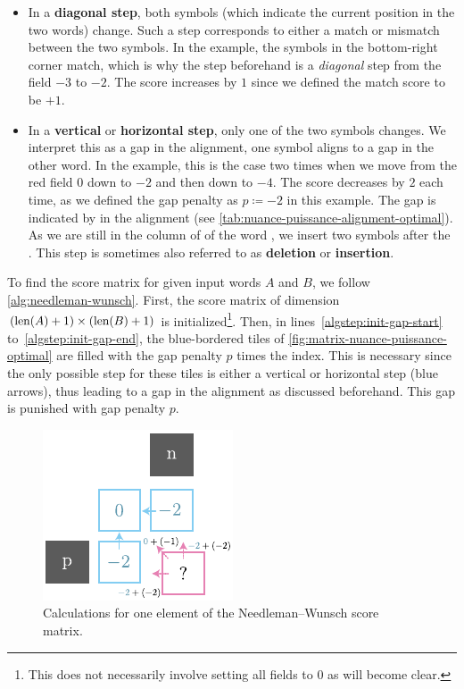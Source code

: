 \begin{itemize}

    \item In a \textbf{diagonal step}, both symbols (which indicate the current position in the two words) change. Such a step corresponds to either a match or mismatch between the two symbols. In the example, the  symbols in the bottom-right corner match, which is why the step beforehand is a \textit{diagonal} step from the field $-3$ to $-2$. The score increases by $1$ since we defined the match score to be $+1$.

    \item In a \textbf{vertical} or \textbf{horizontal step}, only one of the two symbols changes. We interpret this as a gap in the alignment, \ie one symbol aligns to a gap in the other word. In the example, this is the case two times when we move from the red field $0$ down to $-2$ and then down to $-4$. The score decreases by $2$ each time, as we defined the gap penalty as $p \coloneqq -2$ in this example. The gap is indicated by \q{--} in the alignment (see \autoref{tab:nuance-puissance-alignment-optimal}). As we are still in the column of \textipa{/\textturnh/} of the word , we insert two \q{--} symbols after the \textipa{/\textturnh/}. This step is sometimes also referred to as \textbf{deletion} or \textbf{insertion}.
    
\end{itemize}

To find the score matrix for given input words $A$ and $B$, we follow \autoref{alg:needleman-wunsch}. First, the score matrix of dimension $(\text{len}(A)+1) \times (\text{len}(B)+1)$ is initialized\footnote{This does not necessarily involve setting all fields to $0$ as will become clear.}. Then, in lines~\ref{algstep:init-gap-start} to~\ref{algstep:init-gap-end}, the blue-bordered tiles of \autoref{fig:matrix-nuance-puissance-optimal} are filled with the gap penalty $p$ times the index. This is necessary since the only possible step for these tiles is either a vertical or horizontal step (blue arrows), thus leading to a gap in the alignment as discussed beforehand. This gap is punished with gap penalty $p$.

\begin{figure}[H]
    \centering
    \includegraphics[width=0.6\linewidth]{assets/illustrator/matrix-nuance-puissance-subcalc.pdf}
    \caption{Calculations for one element of the Needleman–Wunsch score matrix.}
    \label{fig:matrix-nuance-puissance-subcalc}
\end{figure}

